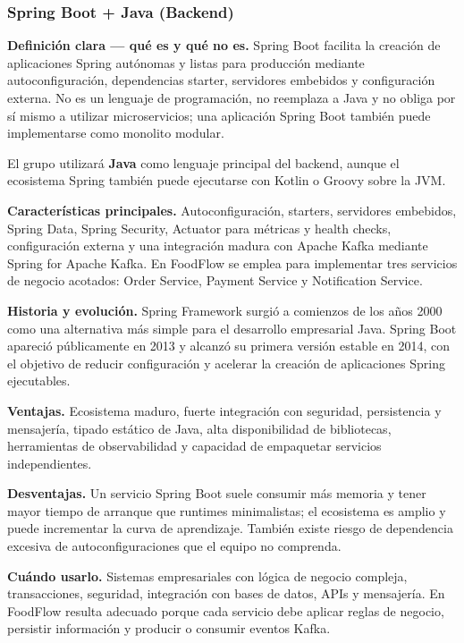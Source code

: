 \documentclass[12pt,a4paper]{article}
\begin{document}
\subsubsection{Spring Boot + Java (Backend)}

\textbf{Definición clara --- qué es y qué no es.} Spring Boot facilita la creación de aplicaciones Spring autónomas y listas para producción mediante autoconfiguración, dependencias starter, servidores embebidos y configuración externa. No es un lenguaje de programación, no reemplaza a Java y no obliga por sí mismo a utilizar microservicios; una aplicación Spring Boot también puede implementarse como monolito modular. \cite{spring-boot}

El grupo utilizará \textbf{Java} como lenguaje principal del backend, aunque el ecosistema Spring también puede ejecutarse con Kotlin o Groovy sobre la JVM.

\textbf{Características principales.} Autoconfiguración, starters, servidores embebidos, Spring Data, Spring Security, Actuator para métricas y health checks, configuración externa y una integración madura con Apache Kafka mediante Spring for Apache Kafka. En FoodFlow se emplea para implementar tres servicios de negocio acotados: Order Service, Payment Service y Notification Service. \cite{spring-boot,spring-kafka}

\textbf{Historia y evolución.} Spring Framework surgió a comienzos de los años 2000 como una alternativa más simple para el desarrollo empresarial Java. Spring Boot apareció públicamente en 2013 y alcanzó su primera versión estable en 2014, con el objetivo de reducir configuración y acelerar la creación de aplicaciones Spring ejecutables. \cite{spring-boot-history}

\textbf{Ventajas.} Ecosistema maduro, fuerte integración con seguridad, persistencia y mensajería, tipado estático de Java, alta disponibilidad de bibliotecas, herramientas de observabilidad y capacidad de empaquetar servicios independientes.

\textbf{Desventajas.} Un servicio Spring Boot suele consumir más memoria y tener mayor tiempo de arranque que runtimes minimalistas; el ecosistema es amplio y puede incrementar la curva de aprendizaje. También existe riesgo de dependencia excesiva de autoconfiguraciones que el equipo no comprenda.

\textbf{Cuándo usarlo.} Sistemas empresariales con lógica de negocio compleja, transacciones, seguridad, integración con bases de datos, APIs y mensajería. En FoodFlow resulta adecuado porque cada servicio debe aplicar reglas de negocio, persistir información y producir o consumir eventos Kafka.
\end{document}
